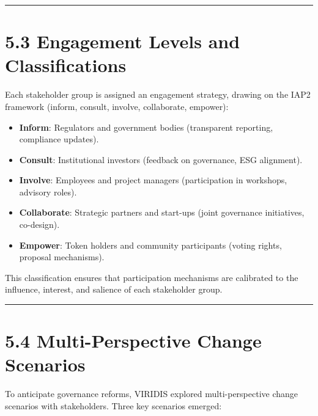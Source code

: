 \documentclass[
  english,
  12pt,
  oneside,
  open=any]{scrbook}
\providecommand{\tightlist}{%
  \setlength{\itemsep}{0pt}\setlength{\parskip}{0pt}}\usepackage{longtable,booktabs,array}
\begin{document}
\begin{center}\rule{0.5\linewidth}{0.5pt}\end{center}

\section{5.3 Engagement Levels and
Classifications}\label{sec-engage-levels}

Each stakeholder group is assigned an engagement strategy, drawing on
the IAP2 framework (inform, consult, involve, collaborate, empower):

\begin{itemize}
\tightlist
\item
  \textbf{Inform}: Regulators and government bodies (transparent
  reporting, compliance updates).\\
\item
  \textbf{Consult}: Institutional investors (feedback on governance, ESG
  alignment).\\
\item
  \textbf{Involve}: Employees and project managers (participation in
  workshops, advisory roles).\\
\item
  \textbf{Collaborate}: Strategic partners and start-ups (joint
  governance initiatives, co-design).\\
\item
  \textbf{Empower}: Token holders and community participants (voting
  rights, proposal mechanisms).
\end{itemize}

This classification ensures that participation mechanisms are calibrated
to the influence, interest, and salience of each stakeholder group.

\begin{center}\rule{0.5\linewidth}{0.5pt}\end{center}

\section{5.4 Multi-Perspective Change Scenarios}\label{sec-scenarios}

To anticipate governance reforms, VIRIDIS explored multi-perspective
change scenarios with stakeholders. Three key scenarios emerged:
\end{document}
